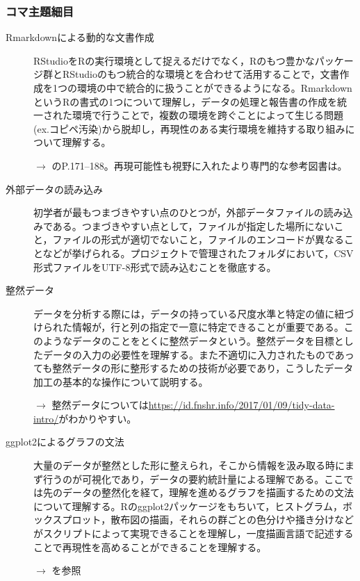 \subsubsection{コマ主題細目}
\begin{description}
	\item[Rmarkdownによる動的な文書作成]RStudioをRの実行環境として捉えるだけでなく，Rのもつ豊かなパッケージ群とRStudioのもつ統合的な環境とを合わせて活用することで，文書作成を1つの環境の中で統合的に扱うことができるようになる。RmarkdownというRの書式の1つについて理解し，データの処理と報告書の作成を統一された環境で行うことで，複数の環境を跨ぐことによって生じる問題(ex.コピペ汚染)から脱却し，再現性のある実行環境を維持する取り組みについて理解する。
	      \begin{flushright}
		      $\to$ \textcite{kosugi2019}のP.171--188。再現可能性も視野に入れたより専門的な参考図書は\textcite{Takahashi201805}。
	      \end{flushright}

	\item[外部データの読み込み]初学者が最もつまづきやすい点のひとつが，外部データファイルの読み込みである。つまづきやすい点として，ファイルが指定した場所にないこと，ファイルの形式が適切でないこと，ファイルのエンコードが異なることなどが挙げられる。プロジェクトで管理されたフォルダにおいて，CSV形式ファイルをUTF-8形式で読み込むことを徹底する。

	\item[整然データ]データを分析する際には，データの持っている尺度水準と特定の値に紐づけられた情報が，行と列の指定で一意に特定できることが重要である。このようなデータのことをとくに整然データという。整然データを目標としたデータの入力の必要性を理解する。また不適切に入力されたものであっても整然データの形に整形するための技術が必要であり，こうしたデータ加工の基本的な操作について説明する。
	      \begin{flushright}
		      $\to$ 整然データについては\url{https://id.fnshr.info/2017/01/09/tidy-data-intro/}がわかりやすい。
	      \end{flushright}

	\item[ggplot2によるグラフの文法]大量のデータが整然とした形に整えられ，そこから情報を汲み取る時にまず行うのが可視化であり，データの要約統計量による理解である。ここでは先のデータの整然化を経て，理解を進めるグラフを描画するための文法について理解する。Rのggplot2パッケージをもちいて，ヒストグラム，ボックスプロット，散布図の描画，それらの群ごとの色分けや掻き分けなどがスクリプトによって実現できることを理解し，一度描画言語で記述することで再現性を高めることができることを理解する。
	      \begin{flushright}
		      $\to$ \textcite{Kinosady2021}を参照
	      \end{flushright}

\end{description}
